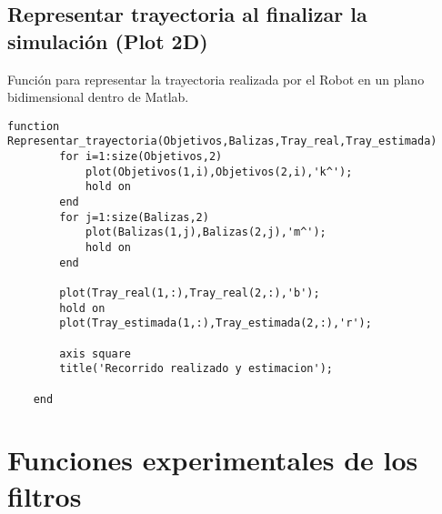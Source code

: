 \subsection{Representar trayectoria al finalizar la simulación (Plot 2D)}
Función para representar la trayectoria realizada por el Robot en un plano bidimensional dentro de Matlab.
\begin{lstlisting}[frame=single]
function Representar_trayectoria(Objetivos,Balizas,Tray_real,Tray_estimada)
        for i=1:size(Objetivos,2)
            plot(Objetivos(1,i),Objetivos(2,i),'k^');
            hold on
        end
        for j=1:size(Balizas,2)
            plot(Balizas(1,j),Balizas(2,j),'m^');
            hold on
        end
        
        plot(Tray_real(1,:),Tray_real(2,:),'b');
        hold on
        plot(Tray_estimada(1,:),Tray_estimada(2,:),'r');
  
        axis square
        title('Recorrido realizado y estimacion');
        
    end
\end{lstlisting}

\section{Funciones experimentales de los filtros}
